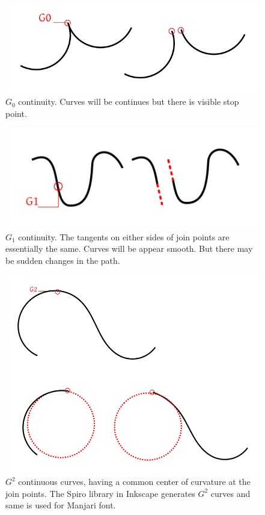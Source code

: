 \documentclass[11pt,twoside,a4paper,parskip=full]{scrartcl}
\begin{document}
\begin{figure}[h!]
	\includegraphics[width=1.0\textwidth]{images/g0.png}
	\caption{$G_0$ continuity. Curves will be continues but there is visible stop point.}
	\label{g0}
\end{figure}

\begin{figure}[h!]
	\includegraphics[width=1.0\textwidth]{images/g1.png}
	\caption{$G_1$ continuity. The tangents on either sides of join points are essentially the same. Curves will be appear smooth. But there may be sudden changes in the path.}
	\label{g1}
\end{figure}

\begin{figure}[h!]
	\includegraphics[width=1.0\textwidth]{images/g2.png}
	\caption{$G^2$ continuous curves, having a common center of curvature at the join points. The Spiro library in Inkscape generates $G^2$ curves and same is used for Manjari font.}
	\label{g2}
\end{figure}
\end{document}
